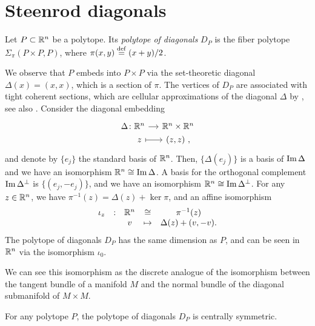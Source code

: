 
\section{Steenrod diagonals}

\begin{definition}
	Let $P\subset \mathbb{R}^n$ be a polytope.
	Its \emph{polytope of diagonals} $D_P$ is the fiber polytope $\Sigma_\pi(P\times P, P)$, where $\pi(x,y)\stackrel{\mathrm{def}}{=} (x+y)/2$.
\end{definition}

We observe that $P$ embeds into $P\times P$ via the set-theoretic diagonal $\Delta (x)=(x,x)$, which is a section of $\pi$.
The vertices of $D_P$ are associated with tight coherent sections, which are cellular approximations of the diagonal $\Delta$ by \cite[Proposition 5]{MTTV19}, see also \cite[Proposition 1.1]{GLA21}.
Consider the diagonal embedding
\[
\begin{tikzcd}[row sep=0, column sep=small]
	\Delta \colon \R^n \arrow{r} & \R^n \times \R^n \\
	\phantom{\Delta \colon} z \arrow[r, |->] & (z,z) \ ,
\end{tikzcd}
\]
and denote by $\{e_j\}$ the standard basis of $\mathbb{R}^n$.
Then, $\{\Delta (e_j)\}$ is a basis of $\operatorname{\mathrm{Im}} \Delta$ and we have an isomorphism $\mathbb{R}^n \cong \operatorname{\mathrm{Im}} \Delta$.
A basis for the orthogonal complement $\operatorname{\mathrm{Im}} \Delta^{\bot}$ is $\{(e_j,-e_j)\}$, and we have an isomorphism $\mathbb{R}^n \cong \operatorname{\mathrm{Im}} \Delta^{\bot}$.
For any $z \in \mathbb{R}^n$, we have $\pi^{-1}(z)=\Delta(z)+\ker \pi$, and an affine isomorphism
\begin{equation} \label{eq:D_P-iso}
	\begin{matrix}
		\iota_z & : & \mathbb{R}^n  & \cong & \pi^{-1}(z) \\
		& & v  & \mapsto & \Delta(z)+(v,-v).
	\end{matrix}
\end{equation}
The polytope of diagonals $D_P$ has the same dimension as $P$, and can be seen in $\mathbb{R}^n$ via the isomorphism $\iota_0$.

\begin{remark}
	We can see this isomorphism as the discrete analogue of the isomorphism between the tangent bundle of a manifold $M$ and the normal bundle of the diagonal submanifold of $M\times M$.
\end{remark}

\begin{proposition}
	For any polytope $P$, the polytope of diagonals $D_P$ is centrally symmetric.
\end{proposition}

